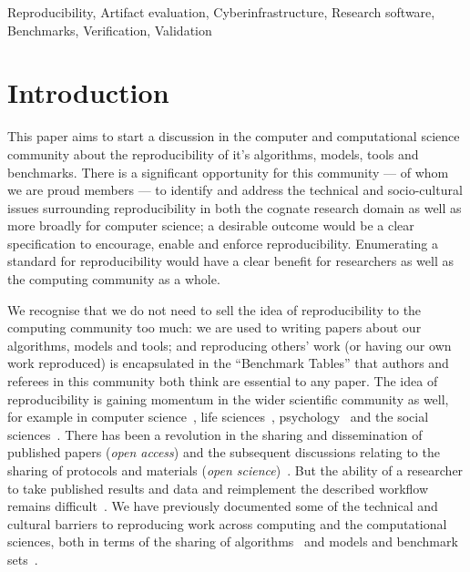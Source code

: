 \documentclass[conference]{IEEEtran}
\begin{document}
%

\begin{IEEEkeywords}
Reproducibility, Artifact evaluation, Cyberinfrastructure, Research
software, Benchmarks, Verification, Validation
\end{IEEEkeywords}


\section{Introduction}

This paper aims to start a discussion in the computer and
computational science community about the reproducibility of it's
algorithms, models, tools and benchmarks. There is a significant
opportunity for this community --- of whom we are proud members --- to
identify and address the technical and socio-cultural issues
surrounding reproducibility in both the cognate research domain as
well as more broadly for computer science; a desirable outcome would
be a clear specification to encourage, enable and enforce
reproducibility. Enumerating a standard for reproducibility would have
a clear benefit for researchers as well as the computing community as
a whole.

We recognise that we do not need to sell the idea of reproducibility
to the computing community too much: we are used to writing papers
about our algorithms, models and tools; and reproducing others' work
(or having our own work reproduced) is encapsulated in the ``Benchmark
Tables'' that authors and referees in this community both think are
essential to any paper. The idea of reproducibility is gaining
momentum in the wider scientific community as well, for example in
computer science~\cite{collberg-et-al:2014}, life
sciences~\cite{rollins-et-al:2014},
psychology~\cite{chambers-et-al:2014} and the social
sciences~\cite{conte-et-al:2012}.  There has been a revolution in the
sharing and dissemination of published papers (\emph{open access}) and
the subsequent discussions relating to the sharing of protocols and
materials (\emph{open science})~\cite{rssaaoe:2012}. But the ability
of a researcher to take published results and data and reimplement the
described workflow remains
difficult~\cite{peng:2011,sandve-et-al:2013,wilson-et-al:2014}.  We
have previously documented some of the technical and cultural barriers
to reproducing work across computing and the computational sciences,
both in terms of the sharing of algorithms~\cite{crick-et-al_wssspe2}
and models and benchmark
sets~\cite{crick-et-al_recomp2014}. 
\end{document}
